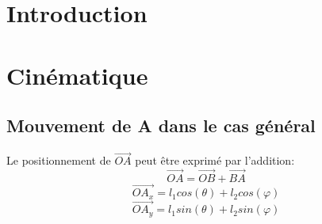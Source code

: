 \documentclass{udes_rapport} %
\begin{document}




\newpage

\tableofcontents
\newpage


\listoffigures
\newpage



\setcounter{page}{1} %
\section{Introduction}

\section{Cinématique}
\subsection{Mouvement de A dans le cas général}
Le positionnement de $\overrightarrow{OA}$ peut être exprimé par l'addition:
\begin{equation}
	\overrightarrow{OA} = \overrightarrow{OB} + \overrightarrow{BA}
\end{equation}
	\[	\overrightarrow{OA_x} = l_1 cos(\theta) + l_2 cos(\varphi) 			\]
	\[	\overrightarrow{OA_y} = l_1 sin(\theta) + l_2 sin(\varphi)			\]
\end{document}
